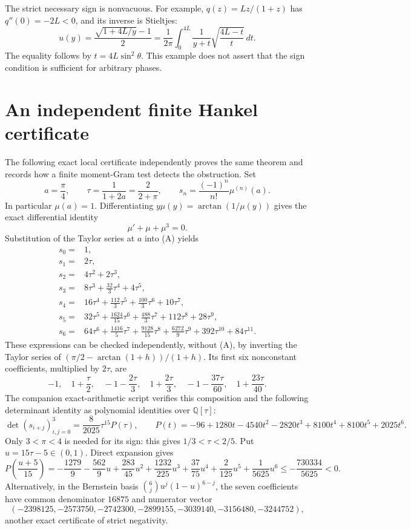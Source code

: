 \documentclass[11pt,a4paper]{article}
\begin{document}
The strict necessary sign is nonvacuous. For example,
$q(z)=Lz/(1+z)$ has $q''(0)=-2L<0$, and its inverse is Stieltjes:
\[
 u(y)=\frac{\sqrt{1+4L/y}-1}{2}
 =\frac1{2\pi}\int_0^{4L}\frac1{y+t}
                         \sqrt{\frac{4L-t}{t}}\,dt.
\]
The equality follows by $t=4L\sin^2\theta$. This example does not
assert that the sign condition is sufficient for arbitrary phases.

\section{An independent finite Hankel certificate}
The following exact local certificate independently proves the same
theorem and records how a finite moment-Gram test detects the
obstruction. Set
\[
 a=\frac\pi4,\qquad \tau=\frac1{1+2a}=\frac2{2+\pi},\qquad
 s_n=\frac{(-1)^n}{n!}\mu^{(n)}(a).
\]
In particular $\mu(a)=1$. Differentiating
$y\mu(y)=\arctan(1/\mu(y))$ gives the exact differential identity
\begin{equation}
 [1+y(1+\mu^2)]\mu'+\mu+\mu^3=0. \tag{A}
\end{equation}
Substitution of the Taylor series at $a$ into (A) yields
\begin{align*}
 s_0={}&1,\\
 s_1={}&2\tau,\\
 s_2={}&4\tau^2+2\tau^3,\\
 s_3={}&8\tau^3+\frac{32}{3}\tau^4+4\tau^5,\\
 s_4={}&16\tau^4+\frac{112}{3}\tau^5+\frac{100}{3}\tau^6+10\tau^7,\\
 s_5={}&32\tau^5+\frac{1624}{15}\tau^6+\frac{488}{3}\tau^7
                +112\tau^8+28\tau^9,\\
 s_6={}&64\tau^6+\frac{1416}{5}\tau^7+\frac{9128}{15}\tau^8
                +\frac{6272}{9}\tau^9+392\tau^{10}+84\tau^{11}.
\end{align*}
These expressions can be checked independently, without (A), by
inverting the Taylor series of $(\pi/2-\arctan(1+h))/(1+h)$.
Its first six nonconstant coefficients, multiplied by $2\tau$, are
\[
 -1,\quad 1+\frac\tau2,\quad -1-\frac{2\tau}3,\quad
 1+\frac{2\tau}3,\quad -1-\frac{37\tau}{60},\quad
 1+\frac{23\tau}{40}.
\]
The companion exact-arithmetic script verifies this composition and
the following determinant identity as polynomial identities over
$\mathbb Q[\tau]$:
\begin{equation}
 \det(s_{i+j})_{i,j=0}^3
 =\frac8{2025}\tau^{15}P(\tau),\qquad
 P(t)=-96+1280t-4540t^2-2820t^3+8100t^4+8100t^5+2025t^6.
 \tag{B}
\end{equation}
Only $3<\pi<4$ is needed for its sign: this gives
$1/3<\tau<2/5$. Put $u=15\tau-5\in(0,1)$. Direct expansion gives
\[
 P\left(\frac{u+5}{15}\right)
 =-\frac{1279}{9}-\frac{562}{9}u+\frac{283}{45}u^2
   +\frac{1232}{225}u^3+\frac{37}{75}u^4
   +\frac2{125}u^5+\frac1{5625}u^6
 \le-\frac{730334}{5625}<0.
\]
Alternatively, in the Bernstein basis
$\binom6j u^j(1-u)^{6-j}$, the seven coefficients have common
denominator $16875$ and numerator vector
\[
 (-2398125,-2573750,-2742300,-2899155,
   -3039140,-3156480,-3244752),
\]
another exact certificate of strict negativity.
\end{document}
